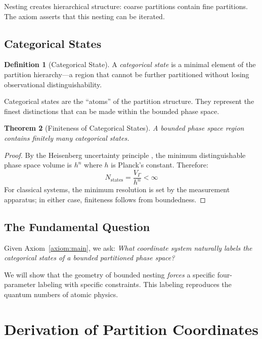 \documentclass[twocolumn,10pt,a4paper]{article}
\newtheorem{theorem}{Theorem}[section]
\theoremstyle{definition}
\newtheorem{definition}[theorem]{Definition}
\theoremstyle{remark}
\begin{document}
Nesting creates hierarchical structure: coarse partitions contain fine partitions. The axiom asserts that this nesting can be iterated.

\subsection{Categorical States}

\begin{definition}[Categorical State]
A \emph{categorical state} is a minimal element of the partition hierarchy---a region that cannot be further partitioned without losing observational distinguishability.
\end{definition}

Categorical states are the ``atoms'' of the partition structure. They represent the finest distinctions that can be made within the bounded phase space.

\begin{theorem}[Finiteness of Categorical States]
\label{thm:finiteness}
A bounded phase space region contains finitely many categorical states.
\end{theorem}

\begin{proof}
By the Heisenberg uncertainty principle \cite{heisenberg1927}, the minimum distinguishable phase space volume is $h^n$ where $h$ is Planck's constant. Therefore:
\begin{equation}
    N_{\text{states}} = \frac{V_\Gamma}{h^n} < \infty
\end{equation}
For classical systems, the minimum resolution is set by the measurement apparatus; in either case, finiteness follows from boundedness.
\end{proof}

\subsection{The Fundamental Question}

Given Axiom~\ref{axiom:main}, we ask: \emph{What coordinate system naturally labels the categorical states of a bounded partitioned phase space?}

We will show that the geometry of bounded nesting \emph{forces} a specific four-parameter labeling with specific constraints. This labeling reproduces the quantum numbers of atomic physics.

\section{Derivation of Partition Coordinates}
\label{sec:coordinates}
\end{document}
